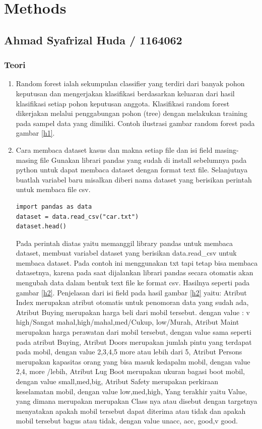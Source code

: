 \chapter{Methods}

\section{Ahmad Syafrizal Huda / 1164062}
\subsection{Teori}
\begin{enumerate}
\item Random forest ialah sekumpulan classifier yang terdiri dari banyak pohon keputusan dan mengerjakan klasifikasi berdasarkan keluaran dari hasil klasifikasi setiap pohon keputusan anggota. Klasifikasi random forest dikerjakan melalui penggabungan pohon (tree) dengan melakukan training pada sampel data yang dimiliki. Contoh ilustrasi gambar random forest pada gambar \ref{h1}.
\item Cara membaca dataset kasus dan makna setiap file dan isi field masing-masing file
\subitem Gunakan librari pandas yang sudah di install sebelumnya pada python untuk dapat membaca dataset dengan format text file.
\subitem  Selanjutnya buatlah variabel baru misalkan diberi nama dataset yang berisikan perintah untuk membaca file csv.
\begin{verbatim}
import pandas as data
dataset = data.read_csv("car.txt")
dataset.head()
\end{verbatim}
\subitem Pada perintah diatas yaitu memanggil library pandas untuk membaca dataset, membuat variabel dataset yang berisikan data.read\_csv untuk membaca dataset. Pada contoh ini menggunakan txt tapi tetap bisa membaca datasetnya, karena pada saat dijalankan librari pandas secara otomatis akan mengubah data dalam bentuk text file ke format csv. Hasilnya seperti pada gambar \ref{h2}.
\subitem Penjelasan dari isi field pada hasil gambar \ref{h2} yaitu: Atribut Index merupakan atribut otomatis untuk penomoran data yang sudah ada, Atribut Buying merupakan harga beli dari mobil tersebut. dengan value : v high/Sangat mahal,high/mahal,med/Cukup, low/Murah, Atribut Maint merupakan harga perawatan dari mobil tersebut, dengan value sama seperti pada atribut Buying, Atribut Doors merupakan jumlah pintu yang terdapat pada mobil, dengan value 2,3,4,5 more atau lebih dari 5, Atribut Persons merupakan kapasitas orang yang bisa masuk kedapalm mobil, dengan value 2,4, more /lebih, Atribut Lug Boot merupakan ukuran bagasi boot mobil, dengan value small,med,big, Atribut Safety merupakan perkiraan keselamatan mobil, dengan value low,med,high, Yang terakhir yaitu Value, yang dimana merupakan merupakan Class nya atau disebut dengan targetnya menyatakan apakah mobil tersebut dapat diterima atau tidak dan apakah mobil tersebut bagus atau tidak, dengan value unacc, acc, good,v good.

\end{enumerate}
